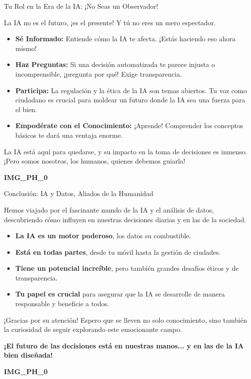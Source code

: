 \documentclass[aspectratio=169]{beamer}
\begin{document}
\begin{frame}[fragile]{Tu Rol en la Era de la IA: ¡No Seas un Observador!}


La IA no es el futuro, ¡es el presente! Y tú no eres un mero espectador.

\begin{itemize}
  \item \textbf{Sé Informado:} Entiende cómo la IA te afecta. ¡Estás haciendo eso ahora mismo!
  \item \textbf{Haz Preguntas:} Si una decisión automatizada te parece injusta o incomprensible, ¡pregunta por qué! Exige transparencia.
  \item \textbf{Participa:} La regulación y la ética de la IA son temas abiertos. Tu voz como ciudadano es crucial para moldear un futuro donde la IA sea una fuerza para el bien.
  \item \textbf{Empodérate con el Conocimiento:} ¡Aprende! Comprender los conceptos básicos te dará una ventaja enorme.
\end{itemize}
La IA está aquí para quedarse, y su impacto en la toma de decisiones es inmenso. ¡Pero somos nosotros, los humanos, quienes debemos guiarla!

\textbf{IMG\_PH\_0}

\end{frame}



\begin{frame}[fragile]{Conclusión: IA y Datos, Aliados de la Humanidad}


Hemos viajado por el fascinante mundo de la IA y el análisis de datos, descubriendo cómo influyen en nuestras decisiones diarias y en las de la sociedad.

\begin{itemize}
  \item \textbf{La IA es un motor poderoso}, los datos su combustible.
  \item \textbf{Está en todas partes}, desde tu móvil hasta la gestión de ciudades.
  \item \textbf{Tiene un potencial increíble}, pero también grandes desafíos éticos y de transparencia.
  \item \textbf{Tu papel es crucial} para asegurar que la IA se desarrolle de manera responsable y beneficie a todos.
\end{itemize}
¡Gracias por su atención! Espero que se lleven no solo conocimiento, sino también la curiosidad de seguir explorando este emocionante campo.

\textbf{¡El futuro de las decisiones está en nuestras manos... y en las de la IA bien diseñada!}

\textbf{IMG\_PH\_0}

\end{frame}
\end{document}
